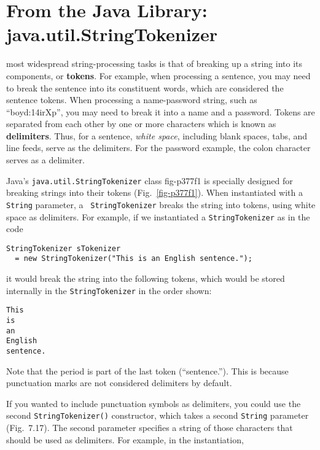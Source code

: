 \section{From the Java Library: \\java.util.StringTokenizer}

 most widespread string-processing tasks is that
of breaking \WWWjava up a string into its components, or {\bf tokens}.
For example, when processing a sentence, you may need to break the
sentence into its constituent words, which are considered the sentence
tokens.  When processing a name-password string, such as
``boyd:14irXp'', you may need to break it into a name and a password.
Tokens are separated from each other by one or more characters which
is known as {\bf delimiters}. Thus, for a sentence, {\em white space},
including blank spaces, tabs, and line feeds, serve as the delimiters.
For the password example, the colon character serves as a delimiter.

Java's {\tt java.util.StringTokenizer} class
{fig-p377f1}
is specially designed for breaking strings into their tokens
(Fig.~\ref{fig-p377f1}). When instantiated with a {\tt String} parameter, a {\tt
StringTokenizer} breaks the string into tokens, using white space as
delimiters.  For example, if we instantiated a {\tt StringTokenizer}
as in the code

\begin{jjjlisting}
\begin{lstlisting}
StringTokenizer sTokenizer
  = new StringTokenizer("This is an English sentence.");
\end{lstlisting}
\end{jjjlisting}

\noindent it would break the string into the following
tokens, which would be stored internally in the {\tt StringTokenizer}
in the  order shown:

\begin{jjjlisting}
\begin{lstlisting}
This
is
an
English
sentence.
\end{lstlisting}
\end{jjjlisting}

\noindent Note that the period is part of the last token
(``sentence.''). This is because punctuation marks are not
considered delimiters by default.  

If you wanted to include punctuation symbols as delimiters, you could
use the second {\tt StringTokenizer()} constructor, which takes a
second {\tt String} parameter (Fig.~7.17).  The second
parameter specifies a string of those characters that should be used
as delimiters.  For example, in the  instantiation,

